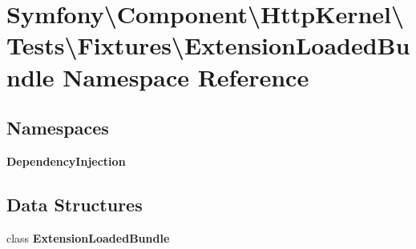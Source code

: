 \section{Symfony\textbackslash{}Component\textbackslash{}Http\+Kernel\textbackslash{}Tests\textbackslash{}Fixtures\textbackslash{}Extension\+Loaded\+Bundle Namespace Reference}
\label{namespace_symfony_1_1_component_1_1_http_kernel_1_1_tests_1_1_fixtures_1_1_extension_loaded_bundle}
\subsection*{Namespaces}
\begin{DoxyCompactItemize}
\item 
 {\bf Dependency\+Injection}
\end{DoxyCompactItemize}
\subsection*{Data Structures}
\begin{DoxyCompactItemize}
\item 
class {\bf Extension\+Loaded\+Bundle}
\end{DoxyCompactItemize}
